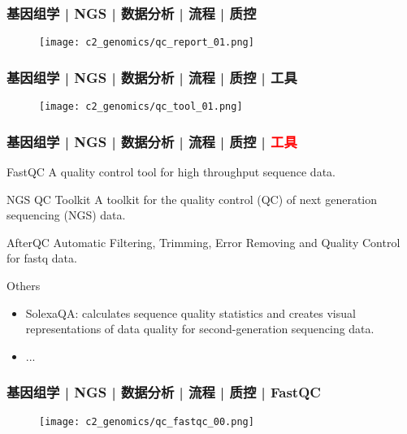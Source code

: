 \begin{frame}
  \frametitle{基因组学 | NGS | 数据分析 | 流程 | 质控}
  \begin{figure}
    \centering
    \texttt{[image: c2\_genomics/qc\_report\_01.png]}
  \end{figure}
\end{frame}

\begin{frame}
  \frametitle{基因组学 | NGS | 数据分析 | 流程 | 质控 | 工具}
  \begin{figure}
    \centering
    \texttt{[image: c2\_genomics/qc\_tool\_01.png]}
  \end{figure}
\end{frame}

\begin{frame}
  \frametitle{基因组学 | NGS | 数据分析 | 流程 | 质控 | \textcolor{red}{工具}}
  \begin{block}{FastQC}
    A quality control tool for high throughput sequence data.
  \end{block}
  \vspace{-0.2em}
  \pause
  \begin{block}{NGS QC Toolkit}
    A toolkit for the quality control (QC) of next generation sequencing (NGS) data.
  \end{block}
  \vspace{-0.2em}
  \pause
  \begin{block}{AfterQC}
    Automatic Filtering, Trimming, Error Removing and Quality Control for fastq data.
  \end{block}
  \vspace{-0.2em}
  \pause
  \begin{block}{Others}
    \begin{itemize}
      \item SolexaQA: calculates sequence quality statistics and creates visual representations of data quality for second-generation sequencing data.
      \item ...
    \end{itemize}
  \end{block}
\end{frame}

\begin{frame}
  \frametitle{基因组学 | NGS | 数据分析 | 流程 | 质控 | FastQC}
  \begin{figure}
    \centering
    \texttt{[image: c2\_genomics/qc\_fastqc\_00.png]}
  \end{figure}
\end{frame}

